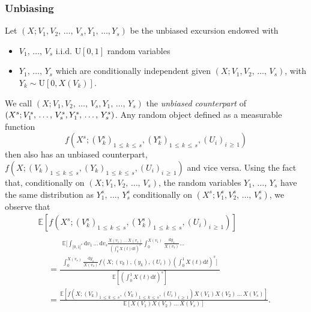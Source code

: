 \documentclass[AHL,Unicode,longabstracts,published]{cedram}
\newcommand{\intervalle}[4]{\mathopen{#1}#2
\mathclose{}\mathpunct{},#3
\mathclose{#4}}
\newcommand{\intervalleff}[2]{\intervalle{[}{#1}{#2}{]}}
\newcommand{\E}[1]{\ensuremath{\mathbb{E} \left[#1 \right]}}
\newcommand{\rmd}{\mathrm{d}}
\newcommand{\rmU}{\mathrm{U}}
\newcommand{\bbE}{\mathbb{E}}
\begin{document}
\subsubsection{Unbiasing}
Let $(X;V_1,V_2,\,\dots,\,V_s,Y_1,\,\dots,Y_s)$ be the unbiased excursion endowed with
\begin{itemize}
\item $V_1,\,\dots,\,V_s$ i.i.d. $\rmU[0,1]$ random variables
\item $Y_1,\,\dots,\,Y_s$ which are conditionally independent given $(X;V_1,V_2,\,\dots,\,V_s)$, with $Y_k \sim \rmU[0,X(V_k)]$.
\end{itemize}
We call $(X;V_1,V_2,\,\dots,\,V_s,Y_1,\,\dots,\,Y_s)$ the \emph{unbiased counterpart} of $(X^s;V^s_1,\,\dots,\,V^s_s,\linebreak Y^s_1,\,\dots,\,Y^s_s)$. Any random object defined as a measurable function 
\[
f\left(X^s;(V^s_k)_{1\,\leq\,k\,\leq\,s},\left(Y^s_k\right)_{1\,\leq\,k\,\leq\,s},(U_i)_{i\,\geq\,1}\right)
\]
then also has an unbiased counterpart, $f(X;(V_k)_{1\,\leq\,k\,\leq\,s},(Y_k)_{1\,\leq\,k\,\leq\, s},(U_i)_{i\,\geq\,1})$ and vice versa. Using the fact that, conditionally on $(X;V_1,V_2,\,\dots,\,V_s)$, the random variables $Y_1,\,\dots,\,Y_s$ have the same distribution as $Y^s_1,\,\dots,\,Y^s_s$ conditionally on $(X^s;V^s_1,V^s_2,\,\dots,\,V^s_s)$, we observe that
\begin{multline}\label{eq:change of measure}
\E{f\left(X^s;\left(V^s_k\right)_{1\,\leq\,k\,\leq \,s},\left(Y^s_k\right)_{1\,\leq\,k\,\leq\,s},\left(U_i\right)_{i\,\geq\,1}\right)}  \\
\begin{aligned}
&=\frac{
\begin{aligned}
\bbE\Bigg[\int_{\intervalleff{0}{1}^s}\rmd v_1\,\ldots\,\rmd v_s \frac{X\left(v_1\right)\,\ldots\,X\left(v_s\right)}{\left(\int_0^1 X(t) \rmd t \right)^s} \int_{0}^{X(v_1)}\frac{\rmd y_1}{X(v_1)}\ldots\\
\int_{0}^{X\left(v_s\right)}\frac{\rmd y_s}{X\left(v_s\right)} f\left(X; \left(v_k\right),\left(y_k\right),\left(U_i\right)\right) \left(\int_0^1 X(t) \rmd t \right)^s\Bigg]
\end{aligned}}{ \E{\left(\int_0^1 X(t) \rmd t \right)^s} }\\
&= \frac{\E{f\left(X; \left(V_k\right)_{1\,\leq\,k\, \leq\,s}, \left(Y_k\right)_{1\,\leq\,k\,\leq\,s},\left(U_i\right)_{i\,\geq\,1}\right) X\left(V_1\right)X\left(V_2\right)\,\ldots\,X\left(V_s\right)}}{ \E{X\left(V_1\right) X\left(V_2\right)\,\ldots\,X\left(V_s\right)}}.
\end{aligned}
\end{multline}
\end{document}
